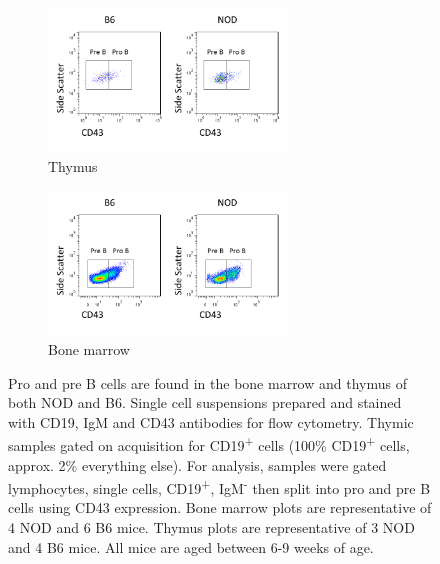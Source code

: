 


\begin{figure}	
	\begin{subfigure}{\textwidth}
	\centering
	\includegraphics[width=0.7\textwidth]{Figures/Thymuspropre.png}
	\caption{Thymus}
	\label{subfig:Thypropre}
	\end{subfigure}
	\begin{subfigure}{\textwidth}
	\centering
	\includegraphics[width=0.7\textwidth]{Figures/Bonemarrowpropre.png}
	\caption{Bone marrow}
	\label{subfig:BMpropre}
	\end{subfigure}
\caption[Pro and pre B cells are present in NOD and B6 thymi]{Pro and pre B cells are found in the bone marrow and thymus of both NOD and B6. Single cell suspensions prepared and stained with CD19, IgM and CD43 antibodies for flow cytometry. Thymic samples gated on acquisition for CD19\textsuperscript{+} cells (100\% CD19\textsuperscript{+} cells, approx. 2\% everything else). For analysis, samples were gated lymphocytes, single cells, CD19\textsuperscript{+}, IgM\textsuperscript{-} then split into pro and pre B cells using CD43 expression. Bone marrow plots are representative of 4 NOD and 6 B6 mice. Thymus plots are representative of 3 NOD and 4 B6 mice. All mice are aged between 6-9 weeks of age.}
\label{fig:PropreBcells}
\end{figure}





